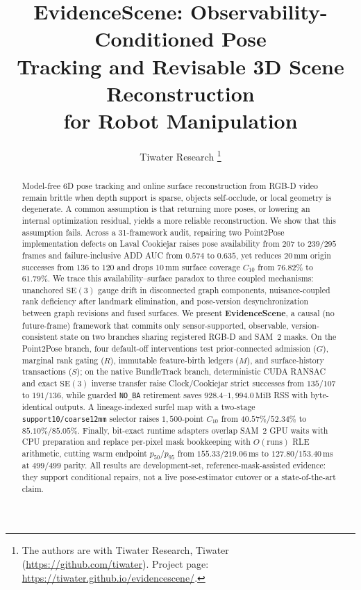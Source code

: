 \documentclass[10pt,journal]{IEEEtran}
\title{EvidenceScene: Observability-Conditioned Pose\\ Tracking and Revisable 3D Scene Reconstruction\\ for Robot Manipulation}
\author{Tiwater Research%
\thanks{The authors are with Tiwater Research, Tiwater (\url{https://github.com/tiwater}). Project page: \url{https://tiwater.github.io/evidencescene/}.}}
\begin{document}
\sloppy
\maketitle

\begin{abstract}
Model-free 6D pose tracking and online surface reconstruction from RGB-D video remain brittle when depth support is sparse, objects self-occlude, or local geometry is degenerate. A common assumption is that returning more poses, or lowering an internal optimization residual, yields a more reliable reconstruction. We show that this assumption fails. Across a 31-framework audit, repairing two Point2Pose implementation defects on Laval Cookiejar raises pose availability from $207$ to $239/295$ frames and failure-inclusive ADD AUC from $0.574$ to $0.635$, yet reduces $20\,\mathrm{mm}$ origin successes from $136$ to $120$ and drops $10\,\mathrm{mm}$ surface coverage $C_{10}$ from $76.82\%$ to $61.79\%$. We trace this availability--surface paradox to three coupled mechanisms: unanchored $\mathrm{SE}(3)$ gauge drift in disconnected graph components, nuisance-coupled rank deficiency after landmark elimination, and pose-version desynchronization between graph revisions and fused surfaces. We present \textbf{EvidenceScene}, a causal (no future-frame) framework that commits only sensor-supported, observable, version-consistent state on two branches sharing registered RGB-D and SAM~2 masks. On the Point2Pose branch, four default-off interventions test prior-connected admission ($G$), marginal rank gating ($R$), immutable feature-birth ledgers ($M$), and surface-history transactions ($S$); on the native BundleTrack branch, deterministic CUDA RANSAC and exact $\mathrm{SE}(3)$ inverse transfer raise Clock/Cookiejar strict successes from $135/107$ to $191/136$, while guarded \texttt{NO\_BA} retirement saves $928.4$--$1{,}994.0\,\mathrm{MiB}$ RSS with byte-identical outputs. A lineage-indexed surfel map with a two-stage \texttt{support10/coarse12mm} selector raises $1{,}500$-point $C_{10}$ from $40.57\%/52.34\%$ to $85.10\%/85.05\%$. Finally, bit-exact runtime adapters overlap SAM~2 GPU waits with CPU preparation and replace per-pixel mask bookkeeping with $O(\text{runs})$ RLE arithmetic, cutting warm endpoint $p_{50}/p_{95}$ from $155.33/219.06\,\mathrm{ms}$ to $127.80/153.40\,\mathrm{ms}$ at $499/499$ parity. All results are development-set, reference-mask-assisted evidence: they support conditional repairs, not a live pose-estimator cutover or a state-of-the-art claim.
\end{abstract}
\end{document}
